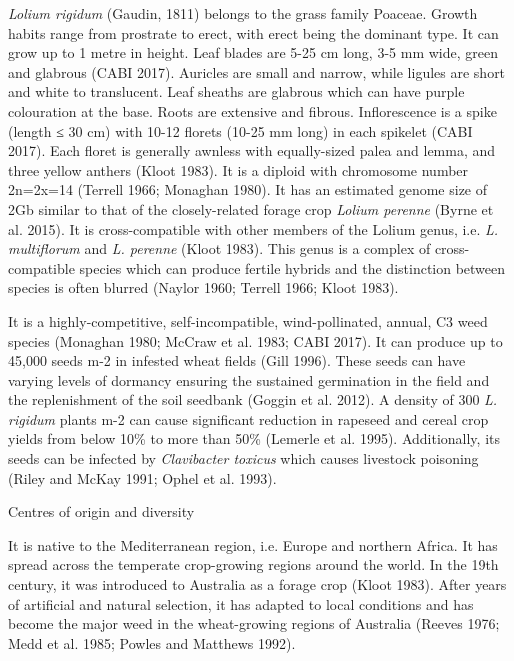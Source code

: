 \emph{Lolium rigidum} (Gaudin, 1811) belongs to the grass family
Poaceae. Growth habits range from prostrate to erect, with erect being
the dominant type. It can grow up to 1 metre in height. Leaf blades are
5-25 cm long, 3-5 mm wide, green and glabrous (CABI 2017). Auricles are
small and narrow, while ligules are short and white to translucent. Leaf
sheaths are glabrous which can have purple colouration at the base.
Roots are extensive and fibrous. Inflorescence is a spike (length ≤ 30
cm) with 10-12 florets (10-25 mm long) in each spikelet (CABI 2017).
Each floret is generally awnless with equally-sized palea and lemma, and
three yellow anthers (Kloot 1983). It is a diploid with chromosome
number 2n=2x=14 (Terrell 1966; Monaghan 1980). It has an estimated
genome size of 2Gb similar to that of the closely-related forage crop
\emph{Lolium perenne} (Byrne et al. 2015). It is cross-compatible with
other members of the Lolium genus, i.e. \emph{L. multiflorum} and
\emph{L. perenne} (Kloot 1983). This genus is a complex of
cross-compatible species which can produce fertile hybrids and the
distinction between species is often blurred (Naylor 1960; Terrell 1966;
Kloot 1983).

It is a highly-competitive, self-incompatible, wind-pollinated, annual,
C3 weed species (Monaghan 1980; McCraw et al. 1983; CABI 2017). It can
produce up to 45,000 seeds m-2 in infested wheat fields (Gill 1996).
These seeds can have varying levels of dormancy ensuring the sustained
germination in the field and the replenishment of the soil seedbank
(Goggin et al. 2012). A density of 300 \emph{L. rigidum} plants m-2 can
cause significant reduction in rapeseed and cereal crop yields from
below 10\% to more than 50\% (Lemerle et al. 1995). Additionally, its
seeds can be infected by \emph{Clavibacter toxicus} which causes
livestock poisoning (Riley and McKay 1991; Ophel et al. 1993).

\protect\hypertarget{anchor-3}{}{}Centres of origin and diversity

It is native to the Mediterranean region, i.e. Europe and northern
Africa. It has spread across the temperate crop-growing regions around
the world. In the 19th century, it was introduced to Australia as a
forage crop (Kloot 1983). After years of artificial and natural
selection, it has adapted to local conditions and has become the major
weed in the wheat-growing regions of Australia (Reeves 1976; Medd et al.
1985; Powles and Matthews 1992).

